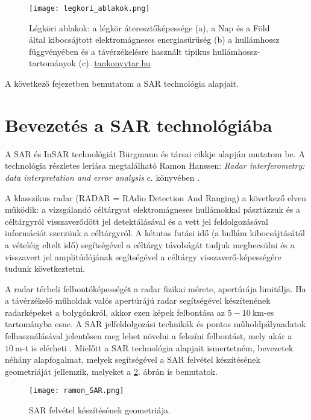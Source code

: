 \documentclass[12pt]{report}
\numberwithin{equation}{section}
\numberwithin{table}{section}
\numberwithin{figure}{section}
\begin{document}
\begin{figure}[H]
    \centering
    \texttt{[image: legkori\_ablakok.png]}
    \caption{Légköri ablakok: a légkör áteresztőképessége (a), a Nap és a Föld által kibocsájtott elektromágneses energiasűrűség (b) a hullámhossz függvényében és a távérzékelésre használt tipikus hullámhossz-tartományok (c). \url{tankonyvtar.hu}}\label{windows}
\end{figure}

A következő fejezetben bemutatom a SAR technológia alapjait.

\section{Bevezetés a SAR technológiába}

A SAR és InSAR technológiát Bürgmann és társai cikkje \cite{BurgmannInSAR} alapján mutatom be. A technológia részletes leríása megtalálható Ramon Hanssen: \textit{Radar interferometry: data interpretation and error analysis} c. könyvében \cite{RamonHanssen}.

A klasszikus radar (RADAR = RAdio Detection And Ranging) a következő elven működik: a vizsgálandó céltárgyat elektromágneses hullámokkal pásztázzuk és a céltárgyról visszaverődött jel detektálásával és a vett jel feldolgozásával információt szerzünk a céltárgyról. A kétutas futási idő (a hullám kibocsájtásától a vételéig eltelt idő) segítségével a céltárgy távolságát tudjuk megbecsülni és a visszavert jel amplitúdójának segítségével a céltárgy visszaverő-képességére
tudunk következtetni.

A radar térbeli felbontóképességét a radar fizikai mérete, apertúrája limitálja. Ha a távérzékelő műholdak valós apertúrájú radar segítségével készítenének radarképeket a bolygónkról, akkor ezen képek felbontása az $5-\SI{10}{\kilo\meter}$-es tartományba esne. A SAR jelfeldolgozási technikák és pontos műholdpályaadatok felhasználásával jelentősen meg lehet növelni a felszíni felbontást, mely akár a $\SI{10}{\meter}$-t is elérheti \cite{BurgmannInSAR}. Mielőtt a SAR technológia alapjait ismertetném, bevezetek néhány alapfogalmat, melyek segítségével a SAR felvétel készítésének geometriáját jellemzik, melyeket a \ref{ramon:sar_geom}. ábrán is bemutatok.

\begin{figure}[H]
    \centering
    \texttt{[image: ramon\_SAR.png]}
    \caption{SAR felvétel készítésének geometriája. \cite{RamonHanssen}}\label{ramon:sar_geom}
\end{figure}
\end{document}
